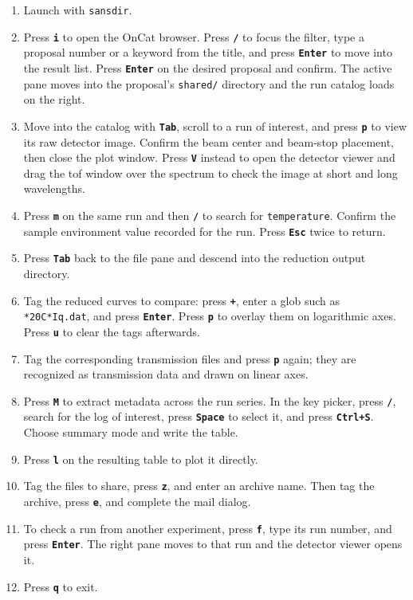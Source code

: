 \documentclass[tm]{ornltm}
\newcommand{\key}[1]{\textbf{\texttt{#1}}}
\begin{document}
\begin{enumerate}
  \item Launch with \texttt{sansdir}.
  \item Press \key{i} to open the OnCat browser. Press \key{/} to focus the
    filter, type a proposal number or a keyword from the title, and press
    \key{Enter} to move into the result list. Press \key{Enter} on the desired
    proposal and confirm. The active pane moves into the proposal's
    \texttt{shared/} directory and the run catalog loads on the right.
  \item Move into the catalog with \key{Tab}, scroll to a run of interest, and
    press \key{p} to view its raw detector image. Confirm the beam center and
    beam-stop placement, then close the plot window. Press \key{V} instead to
    open the detector viewer and drag the \ac{tof} window over the spectrum to
    check the image at short and long wavelengths.
  \item Press \key{m} on the same run and then \key{/} to search for
    \texttt{temperature}. Confirm the sample environment value recorded for the
    run. Press \key{Esc} twice to return.
  \item Press \key{Tab} back to the file pane and descend into the reduction
    output directory.
  \item Tag the reduced curves to compare: press \key{+}, enter a glob such as
    \texttt{*20C*Iq.dat}, and press \key{Enter}. Press \key{p} to overlay them on
    logarithmic axes. Press \key{u} to clear the tags afterwards.
  \item Tag the corresponding transmission files and press \key{p} again; they
    are recognized as transmission data and drawn on linear axes.
  \item Press \key{M} to extract metadata across the run series. In the key
    picker, press \key{/}, search for the log of interest, press \key{Space} to
    select it, and press \key{Ctrl+S}. Choose summary mode and write the table.
  \item Press \key{l} on the resulting table to plot it directly.
  \item Tag the files to share, press \key{z}, and enter an archive name. Then
    tag the archive, press \key{e}, and complete the mail dialog.
  \item To check a run from another experiment, press \key{f}, type its run
    number, and press \key{Enter}. The right pane moves to that run and the
    detector viewer opens it.
  \item Press \key{q} to exit.
\end{enumerate}

\backmatter
\end{document}
